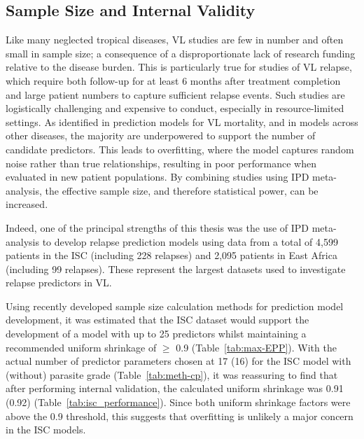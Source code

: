 \subsection{Sample Size and Internal Validity}

Like many neglected tropical diseases, VL studies are few in number and often small in sample size; a consequence of a disproportionate lack of research funding relative to the disease burden. This is particularly true for studies of VL relapse, which require both follow-up for at least 6 months after treatment completion and large patient numbers to capture sufficient relapse events. Such studies are logistically challenging and expensive to conduct, especially in resource-limited settings\cite{alves2018}. As identified in prediction models for VL mortality\cite{wilson2026}, and in models across other diseases\cite{moons2015,wynants2020,peetluk2021,njim2019}, the majority are underpowered to support the number of candidate predictors. This leads to overfitting, where the model captures random noise rather than true relationships, resulting in poor performance when evaluated in new patient populations\cite{moons2015}. By combining studies using IPD meta-analysis, the effective sample size, and therefore statistical power, can be increased\cite{debray2023}.

Indeed, one of the principal strengths of this thesis was the use of IPD meta-analysis to develop relapse prediction models using data from a total of 4,599 patients in the ISC (including 228 relapses) and 2,095 patients in East Africa (including 99 relapses). These represent the largest datasets used to investigate relapse predictors in VL.

Using recently developed sample size calculation methods for prediction model development\cite{riley2019B}, it was estimated that the ISC dataset would support the development of a model with up to 25 predictors whilst maintaining a recommended uniform shrinkage of $\geq$ 0.9 (Table~\ref{tab:max-EPP}). With the actual number of predictor parameters chosen at 17 (16) for the ISC model with (without) parasite grade (Table~\ref{tab:meth-cp}), it was reassuring to find that after performing internal validation, the calculated uniform shrinkage was 0.91 (0.92) (Table~\ref{tab:isc_performance}). Since both uniform shrinkage factors were above the 0.9 threshold, this suggests that overfitting is unlikely a major concern in the ISC models.

